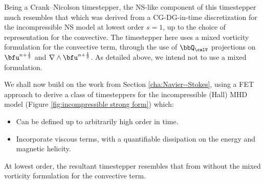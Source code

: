     Being a Crank--Nicolson timestepper, the NS-like component of this timestepper much resembles that which was derived from a CG-DG-in-time discretization for the incompressible NS model at lowest order $s = 1$, up to the choice of representation for the convective. The timestepper here uses a mixed vorticity formulation for the convective term, through the use of $\bbQ_{\calV}$ projections on $\bfu^{n + \frac{1}{2}}$ and $\nabla\wedge\bfu^{n + \frac{1}{2}}$. As detailed above, we intend not to use a mixed formulation.

    \line

    We shall now build on the work from Section \ref{cha:Navier--Stokes}, using a FET approach to derive a class of timesteppers for the incompressible (Hall) MHD model (Figure \ref{fig:incompressible strong form}) which:
    \begin{itemize}
        \item  Can be defined up to arbitrarily high order in time.
        \item  Incorporate viscous terms, with a quantifiable dissipation on the energy and magnetic helicity.
    \end{itemize}
    At lowest order, the resultant timestepper resembles that from \cite{Laakmann_Hu_Farrell_2022} without the mixed vorticity formulation for the convective term.

    \shortline

